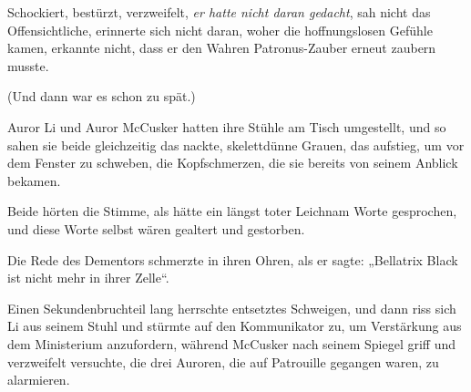 Schockiert, bestürzt, verzweifelt, \emph{er hatte nicht daran gedacht}, sah nicht das Offensichtliche, erinnerte sich nicht daran, woher die hoffnungslosen Gefühle kamen, erkannte nicht, dass er den Wahren Patronus-Zauber erneut zaubern musste.

(Und dann war es schon zu spät.)

\later

Auror Li und Auror McCusker hatten ihre Stühle am Tisch umgestellt, und so sahen sie beide gleichzeitig das nackte, skelettdünne Grauen, das aufstieg, um vor dem Fenster zu schweben, die Kopfschmerzen, die sie bereits von seinem Anblick bekamen.

Beide hörten die Stimme, als hätte ein längst toter Leichnam Worte gesprochen, und diese Worte selbst wären gealtert und gestorben.

Die Rede des Dementors schmerzte in ihren Ohren, als er sagte:
„Bellatrix Black ist nicht mehr in ihrer Zelle“.

Einen Sekundenbruchteil lang herrschte entsetztes Schweigen, und dann riss sich Li aus seinem Stuhl und stürmte auf den Kommunikator zu, um Verstärkung aus dem Ministerium anzufordern, während McCusker nach seinem Spiegel griff und verzweifelt versuchte, die drei Auroren, die auf Patrouille gegangen waren, zu alarmieren.

